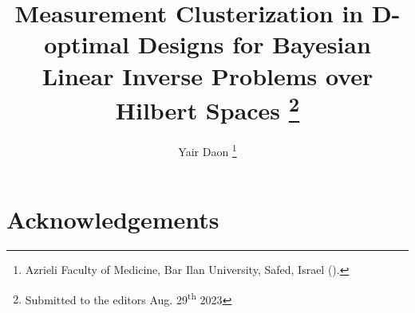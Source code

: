 \documentclass{siamart220329}
\title{Measurement Clusterization in D-optimal Designs for Bayesian
  Linear Inverse Problems over Hilbert Spaces
  \thanks{Submitted to the editors Aug. 29\textsuperscript{th} 2023}
}
\author{Yair Daon \thanks{Azrieli Faculty of Medicine, Bar Ilan University, Safed,
      Israel (\email{yair.daon@gmail.com}).}}
\begin{document}
\maketitle

\begin{abstract}
  
\end{abstract}










\section{Acknowledgements}



%

\end{document}
